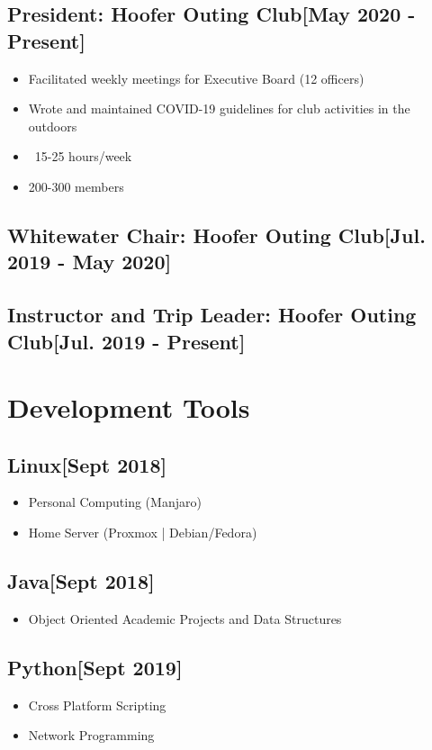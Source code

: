\documentclass{article}
\begin{document}
    \subsection{\textbf{President}: Hoofer Outing Club\hfill[May 2020 - Present]}
        \begin{itemize}
            \item Facilitated weekly meetings for Executive Board (12 officers)
            \item Wrote and maintained COVID-19 guidelines for club activities in the outdoors
            \item ~15-25 hours/week
            \item 200-300 members
        \end{itemize}

    \subsection{\textbf{Whitewater Chair}: Hoofer Outing Club\hfill[Jul. 2019 - May 2020]}

    \subsection{\textbf{Instructor and Trip Leader}: Hoofer Outing Club\hfill[Jul. 2019 - Present]}

\section{Development Tools}

    \subsection{\textbf{Linux}\hfill[Sept 2018]}
        \begin{itemize}
            \item Personal Computing (Manjaro)
            \item Home Server (Proxmox | Debian/Fedora)
        \end{itemize}

    \subsection{\textbf{Java}\hfill{[Sept 2018]}}
        \begin{itemize}
            \item Object Oriented Academic Projects and Data Structures
        \end{itemize}

    \subsection{\textbf{Python}\hfill{[Sept 2019]}}
        \begin{itemize}
            \item Cross Platform Scripting
            \item Network Programming
        \end{itemize}
\end{document}
